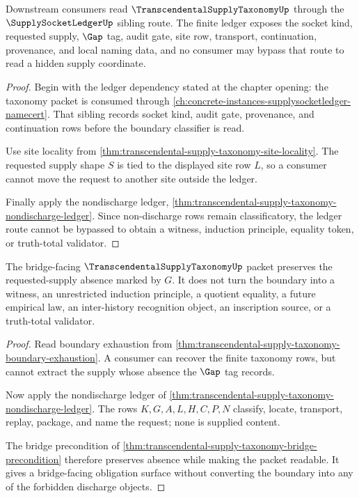 \begin{theorem}
\label{thm:transcendental-supply-taxonomy-socket-ledger-readback}
Downstream consumers read $\TranscendentalSupplyTaxonomyUp$ through the $\SupplySocketLedgerUp$ sibling route. The finite ledger exposes the socket kind, requested supply, $\Gap$ tag, audit gate, site row, transport, continuation, provenance, and local naming data, and no consumer may bypass that route to read a hidden supply coordinate.
\end{theorem}
\begin{proof}
Begin with the ledger dependency stated at the chapter opening: the taxonomy packet is consumed through \autoref{ch:concrete-instances-supplysocketledger-namecert}. That sibling records socket kind, audit gate, provenance, and continuation rows before the boundary classifier is read.

Use site locality from \autoref{thm:transcendental-supply-taxonomy-site-locality}. The requested supply shape $S$ is tied to the displayed site row $L$, so a consumer cannot move the request to another site outside the ledger.

Finally apply the nondischarge ledger, \autoref{thm:transcendental-supply-taxonomy-nondischarge-ledger}. Since non-discharge rows remain classificatory, the ledger route cannot be bypassed to obtain a witness, induction principle, equality token, or truth-total validator.
\end{proof}

\begin{theorem}
\label{thm:transcendental-supply-taxonomy-gap-nondischarge}
The bridge-facing $\TranscendentalSupplyTaxonomyUp$ packet preserves the requested-supply absence marked by $G$. It does not turn the boundary into a witness, an unrestricted induction principle, a quotient equality, a future empirical law, an inter-history recognition object, an inscription source, or a truth-total validator.
\end{theorem}
\begin{proof}
Read boundary exhaustion from \autoref{thm:transcendental-supply-taxonomy-boundary-exhaustion}. A consumer can recover the finite taxonomy rows, but cannot extract the supply whose absence the $\Gap$ tag records.

Now apply the nondischarge ledger of \autoref{thm:transcendental-supply-taxonomy-nondischarge-ledger}. The rows $K,G,A,L,H,C,P,N$ classify, locate, transport, replay, package, and name the request; none is supplied content.

The bridge precondition of \autoref{thm:transcendental-supply-taxonomy-bridge-precondition} therefore preserves absence while making the packet readable. It gives a bridge-facing obligation surface without converting the boundary into any of the forbidden discharge objects.
\end{proof}

